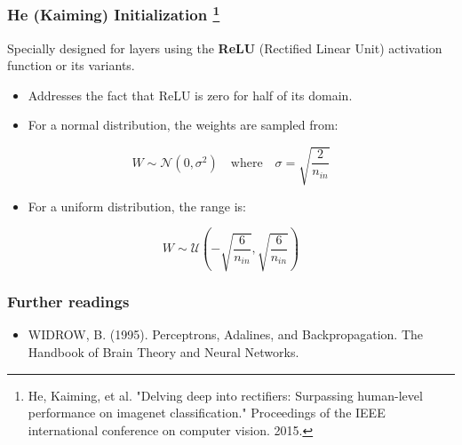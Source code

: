 \documentclass[aspectratio=169]{beamer}
\begin{document}
\begin{frame}
	\frametitle{He (Kaiming) Initialization \footnote{He, Kaiming, et al. "Delving deep into rectifiers: Surpassing human-level performance on imagenet classification." Proceedings of the IEEE international conference on computer vision. 2015.}}
	Specially designed for layers using the \textbf{ReLU} (Rectified Linear Unit) activation function or its variants.
	
	\begin{itemize}
		\item Addresses the fact that ReLU is zero for half of its domain.
		\item For a normal distribution, the weights are sampled from:
	\end{itemize}
	
	\begin{equation}
		W \sim \mathcal{N}\left( 0, \sigma^2 \right) \quad \text{where} \quad \sigma = \sqrt{\frac{2}{n_{in}}}
	\end{equation}
	
	\begin{itemize}
		\item For a uniform distribution, the range is:
	\end{itemize}
	
	\begin{equation}
		W \sim \mathcal{U}\left( -\sqrt{\frac{6}{n_{in}}}, \sqrt{\frac{6}{n_{in}}} \right)
	\end{equation}
\end{frame}



	



\begin{frame}[fragile]
    \frametitle{Further readings}
    \begin{itemize}
		\item WIDROW, B. (1995). Perceptrons, Adalines, and Backpropagation. The Handbook of Brain Theory and Neural Networks.
	\end{itemize}
\end{frame}



%	
%	
%	
\end{document}

